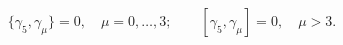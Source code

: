 \begin{equation}
\{\gamma_5,\gamma_\mu\}=0,\quad \mu=0,\ldots,3;\qquad
[\gamma_5,\gamma_\mu]=0,\quad \mu>3.
\end{equation}

